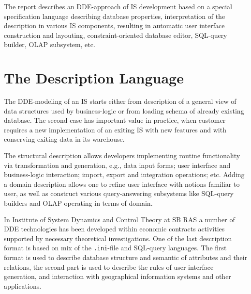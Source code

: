 \documentclass[conference]{IEEEtran}
\newcommand{\e}[2][fcolor]{\textcolor{pcolor}{[}\textcolor{#1}{#2}\textcolor{pcolor}{]}}
\begin{document}
The report describes an DDE-approach of IS development based on a special specification language describing database properties, interpretation of the description in various IS components, resulting in automatic user interface construction and layouting, constraint-oriented database editor, SQL-query builder, OLAP subsystem, etc.

\section{The Description Language}
\label{sec:description-database}


The DDE-modeling of an IS starts either from description of a general view of data structures used by business-logic or from loading schema of already existing database.  The second case has important value in practice, when customer requires a new implementation of an exiting IS with new features and with conserving exiting data in its warehouse.

The structural description allows developers implementing routine functionality via transformation and generation, e.g., data input forms; user interface and business-logic interaction; import, export and integration operations; etc.  Adding a domain description allows one to refine user interface with notions familiar to user, as well as construct various query-answering subsystems like SQL-query builders and OLAP operating in terms of domain.

In Institute of System Dynamics and Control Theory at SB RAS a number of DDE technologies has been developed within economic contracts activities supported by necessary theoretical investigations.  One of the last description format is based on mix of the \texttt{.ini}-file and SQL-query languages.  The first format is used to describe database structure and semantic of attributes and their relations, the second part is used to describe the rules of user interface generation, and interaction with geographical information systems and other applications.
\end{document}
